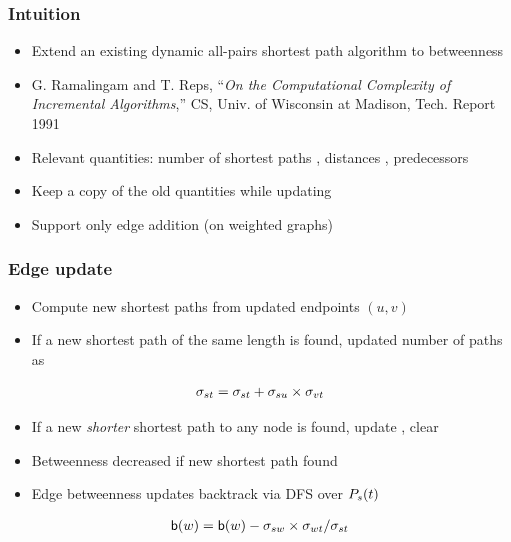 \begin{frame}
  \frametitle{Intuition}

  \begin{itemize}
    \item Extend an existing dynamic all-pairs shortest path algorithm to betweenness
    \item G. Ramalingam and T. Reps, ``\emph{On the Computational Complexity of Incremental Algorithms},'' CS, Univ. of Wisconsin at Madison, Tech. Report 1991
    \item Relevant quantities: number of shortest paths \paths, distances \dist, predecessors \pred
    \item Keep a copy of the old quantities while updating
    \item Support only edge addition (on weighted graphs)
  \end{itemize}

\end{frame}


\begin{frame}
  \frametitle{Edge update}

  \begin{itemize}
    \item Compute new shortest paths from updated endpoints $(u,v)$
    \item If a new shortest path of the same length is found, updated number of paths as
  \end{itemize}
  {\Large
  \begin{align*}
    \sigma_{st} = \sigma_{st} + \sigma_{su} \times \sigma_{vt}
  \end{align*}
  }
    \begin{itemize}
    \item If a new \emph{shorter} shortest path to any node is found, update \dist, clear \paths
    \item Betweenness decreased if new shortest path found
    \item Edge betweenness updates backtrack via DFS over $P_s(t)$
  \end{itemize}
    {\Large
  \begin{align*}
    \mathsf{b}(w) = \mathsf{b}(w) - \sigma_{sw} \times \sigma_{wt} / \sigma_{st}
  \end{align*}
  }
\end{frame}



